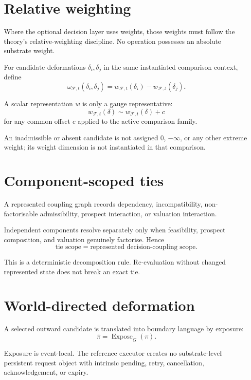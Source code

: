 \documentclass[11pt,a4paper]{article}
\newcommand{\Frame}{\mathcal F}
\theoremstyle{remark}
\begin{document}
\section{Relative weighting}\label{sec:weighting}

Where the optional decision layer uses weights, those weights must follow the theory's relative-weighting discipline. No operation possesses an absolute substrate weight.

For candidate deformations $\delta_i,\delta_j$ in the same instantiated comparison context, define
\[
\omega_{\Frame,t}(\delta_i,\delta_j)
=
w_{\Frame,t}(\delta_i)-w_{\Frame,t}(\delta_j).
\]

A scalar representation $w$ is only a gauge representative:
\[
w_{\Frame,t}(\delta)
\sim
w_{\Frame,t}(\delta)+c
\]
for any common offset $c$ applied to the active comparison family.

An inadmissible or absent candidate is not assigned $0$, $-\infty$, or any other extreme weight; its weight dimension is not instantiated in that comparison.

\section{Component-scoped ties}\label{sec:ties}

A represented coupling graph records dependency, incompatibility, non-factorisable admissibility, prospect interaction, or valuation interaction.

Independent components resolve separately only when feasibility, prospect composition, and valuation genuinely factorise. Hence
\[
\boxed{
\text{tie scope}
=
\text{represented decision-coupling scope}.
}
\]

This is a deterministic decomposition rule. Re-evaluation without changed represented state does not break an exact tie.

\section{World-directed deformation}\label{sec:exposure}

A selected outward candidate is translated into boundary language by exposure:
\[
\bar\pi=\operatorname{Expose}_G(\pi).
\]

Exposure is event-local. The reference executor creates no substrate-level persistent request object with intrinsic pending, retry, cancellation, acknowledgement, or expiry.
\end{document}
